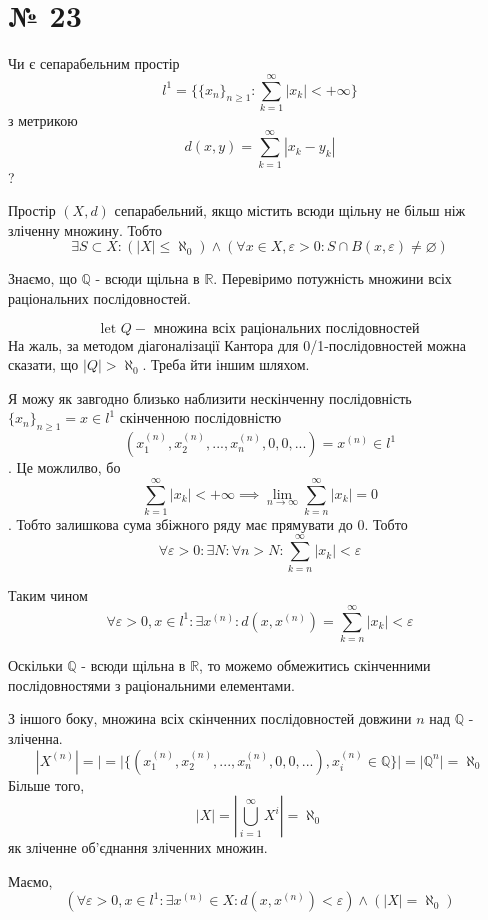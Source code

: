 \documentclass[11pt, a4paper]{article} %
\begin{document}
\section*{№ 23}
\begin{mdframed}
    Чи є сепарабельним простір 
    \[l^1 = \{\{x_n\}_{n\ge1} : \sum_{k=1}^\infty |x_k| < +\infty\}\]
    з метрикою 
    \[d(x,y) = \sum_{k=1}^\infty |x_k - y_k|\]?
\end{mdframed}

\begin{mdframed}[backgroundcolor=purple!20]
    Простір $(X, d)$ сепарабельний, якщо містить всюди щільну не більш ніж зліченну множину.
    Тобто
    \[\exists S \subset X : (|X| \le \aleph_0) \wedge (\forall x \in X, \varepsilon > 0: S \cap B(x,\varepsilon) \ne \varnothing) \]
\end{mdframed}

Знаємо, що $\mathbb Q$ - всюди щільна в $\mathbb R$. 
Перевіримо потужність множини всіх раціональних послідовностей.

\[\text{let } Q - \text{ множина всіх раціональних послідовностей}\]
На жаль, за методом діагоналізації Кантора для 0/1-послідовностей можна сказати, що $|Q| > \aleph_0$.
Треба йти іншим шляхом.

Я можу як завгодно близько наблизити нескінченну послідовність $\{x_n\}_{n\ge1} = x \in l^1$ 
скінченною послідовністю \[(x^{(n)}_1, x^{(n)}_2, ..., x^{(n)}_n, 0, 0, ...) = x^{(n)} \in l^1\].
Це можлилво, бо \[\sum_{k=1}^\infty |x_k| < +\infty \implies \lim_{n\to \infty} \sum_{k=n}^\infty |x_k| = 0  \].
Тобто залишкова сума збіжного ряду має прямувати до 0. Тобто 
\[\forall \varepsilon>0: \exists N: \forall n>N: \sum_{k=n}^\infty |x_k| < \varepsilon\]

Таким чином
\[\forall \varepsilon>0, x \in l^1: \exists x^{(n)}: d(x,x^{(n)}) = \sum_{k=n}^\infty |x_k| < \varepsilon\]

Оскільки $\mathbb Q$ - всюди щільна в $\mathbb R$, то можемо обмежитись скінченними послідовностями з раціональними елементами.

З іншого боку, множина всіх скінченних послідовностей довжини $n$ над $\mathbb Q$ - зліченна.
\[|X^{(n)}|=|=|\{(x^{(n)}_1, x^{(n)}_2, ..., x^{(n)}_n, 0, 0, ...), x^{(n)}_i \in \mathbb Q\}| = |\mathbb Q^n| = \aleph_0\]
Більше того, 
\[|X| = \left|\bigcup_{i=1}^\infty X^{i}\right| = \aleph_0\]
як зліченне об'єднання зліченних множин.

Маємо,
\[\left(\forall \varepsilon>0, x \in l^1: \exists x^{(n)} \in X: d(x,x^{(n)}) < \varepsilon\right) \wedge \left(|X|=\aleph_0\right)\]
\end{document}
